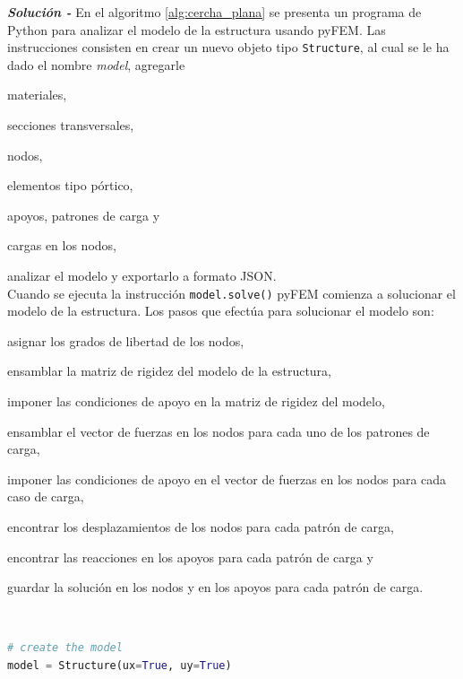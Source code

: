 \begin{ejemplo}
  \emph{\textbf{Solución -}} En el algoritmo \ref{alg:cercha_plana} se presenta un programa de Python para analizar el modelo de la estructura usando pyFEM. Las instrucciones consisten en crear un nuevo objeto tipo \verb|Structure|, al cual se le ha dado el nombre \emph{model}, agregarle
  \begin{inparaenum}[$ (a) $]
  \item materiales,
  \item secciones transversales,
  \item nodos,
  \item elementos tipo pórtico,
  \item apoyos, patrones de carga y
  \item cargas en los nodos,
  \end{inparaenum}
  analizar el modelo y exportarlo a formato JSON.\\

  Cuando se ejecuta la instrucción \verb|model.solve()| pyFEM comienza a solucionar el modelo de la estructura. Los pasos que efectúa para solucionar el modelo son:
  \begin{inparaenum}[$ (1) $]
  \item asignar los grados de libertad de los nodos, 
  \item ensamblar la matriz de rigidez del modelo de la estructura, 
  \item imponer las condiciones de apoyo en la matriz de rigidez del modelo, 
  \item ensamblar el vector de fuerzas en los nodos para cada uno de los patrones de carga, 
  \item imponer las condiciones de apoyo en el vector de fuerzas en los nodos para cada caso de carga, 
  \item encontrar los desplazamientos de los nodos para cada patrón de carga, 
  \item encontrar las reacciones en los apoyos para cada patrón de carga y
  \item guardar la solución en los nodos y en los apoyos para cada patrón de carga.
  \end{inparaenum} \\
  
  \begin{lstlisting}[language=Python,caption=Ingreso de los datos del modelo de la estructura a \textit{pyFEM}.,label=alg:cercha_plana, frame=single]
# create the model
model = Structure(ux=True, uy=True)


\end{lstlisting}
\end{ejemplo}
